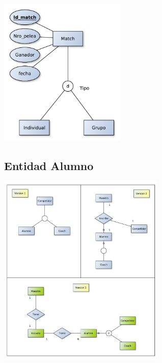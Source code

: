 \begin{center}
\includegraphics[width=6cm,keepaspectratio]{./imagenes/des2.pdf}\newline
\end{center}

\subsection{Entidad Alumno}


\begin{center}
\includegraphics[width=8cm,keepaspectratio]{./imagenes/des3.pdf}\newline
\end{center}


